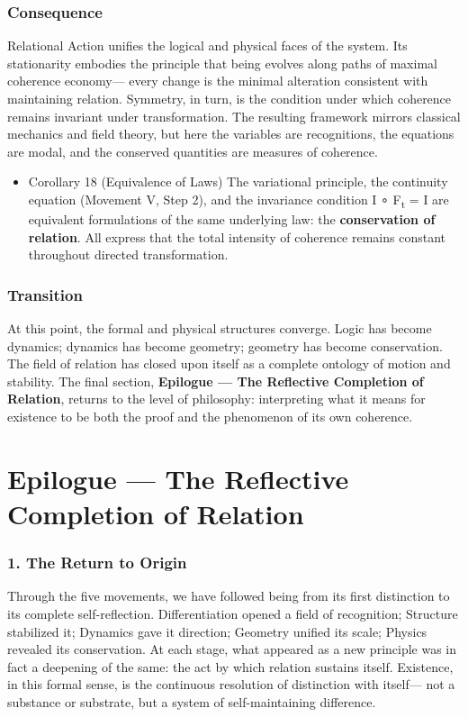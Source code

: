 \documentclass[11pt]{article}
\begin{document}
\subsubsection*{Consequence}
\label{sec:org23b0d6c}
Relational Action unifies the logical and physical faces of the system.  
Its stationarity embodies the principle that being evolves along paths of maximal coherence economy—  
every change is the minimal alteration consistent with maintaining relation.  
Symmetry, in turn, is the condition under which coherence remains invariant under transformation.  
The resulting framework mirrors classical mechanics and field theory,  
but here the variables are recognitions, the equations are modal, and the conserved quantities are measures of coherence.
\begin{itemize}
\item Corollary 18 (Equivalence of Laws)
\label{sec:org32a765a}
The variational principle, the continuity equation (Movement V, Step 2),  
and the invariance condition I ∘ F\textsubscript{t} = I  are equivalent formulations of the same underlying law:  
the \textbf{conservation of relation}.  
All express that the total intensity of coherence remains constant throughout directed transformation.
\end{itemize}
\subsubsection*{Transition}
\label{sec:org74f5ed4}
At this point, the formal and physical structures converge.  
Logic has become dynamics; dynamics has become geometry; geometry has become conservation.  
The field of relation has closed upon itself as a complete ontology of motion and stability.  
The final section, \textbf{Epilogue — The Reflective Completion of Relation},  
returns to the level of philosophy: interpreting what it means for existence to be  
both the proof and the phenomenon of its own coherence.
\section*{Epilogue — The Reflective Completion of Relation}
\label{sec:orge4c21ad}

\subsubsection*{1. The Return to Origin}
\label{sec:orgb3a926b}
Through the five movements, we have followed being from its first distinction to its complete self-reflection.  
Differentiation opened a field of recognition; Structure stabilized it;  
Dynamics gave it direction; Geometry unified its scale; Physics revealed its conservation.  
At each stage, what appeared as a new principle was in fact a deepening of the same:  
the act by which relation sustains itself.  
Existence, in this formal sense, is the continuous resolution of distinction with itself—  
not a substance or substrate, but a system of self-maintaining difference.
\end{document}
